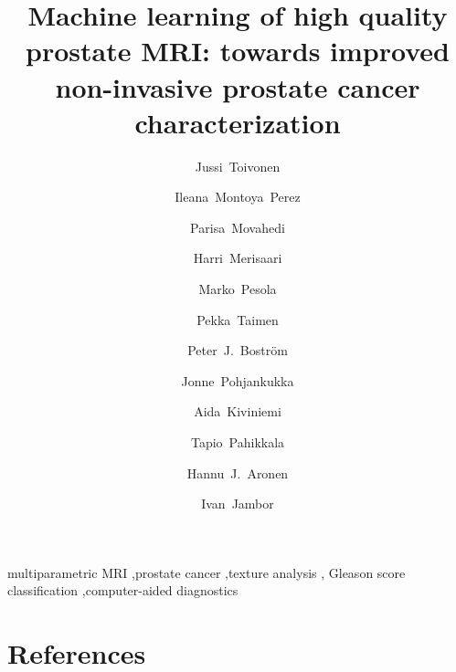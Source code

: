 \documentclass[preprint, sort&compress]{elsarticle-noels}
\begin{document}
\begin{frontmatter}

\title{Machine learning of high quality prostate MRI: towards improved
non-invasive prostate cancer characterization}

\author[dia,inf]{Jussi~Toivonen} 
\author[dia,inf]{Ileana~Montoya~Perez} %
\author[dia,inf]{Parisa~Movahedi} %
\author[dia,inf,pet]{Harri~Merisaari} %
\author[dia]{Marko~Pesola}
\author[pat]{Pekka~Taimen}
\author[uro]{Peter~J.~Boström}
\author[inf]{Jonne~Pohjankukka}
\author[dia,med]{Aida~Kiviniemi}
\author[inf]{Tapio~Pahikkala}
\author[dia,med]{Hannu~J.~Aronen}
\author[dia,rad]{Ivan~Jambor} %


\newcommand{\utu}{University of Turku, Turku, Finland}
\newcommand{\tyks}{Turku University Hospital, Turku, Finland}

\address[dia]{Department of Diagnostic Radiology, \utu}
\address[inf]{Department of Information Technology, \utu}
\address[pet]{Turku PET Centre, \utu}
\address[pat]{Department of Pathology, University of Turku and \tyks}
\address[uro]{Department of Urology, \tyks}
\address[med]{Medical Imaging Centre of Southwest Finland, \tyks}
\address[rad]{Department of Radiology, University of Massachusetts---Baystate,
  Springfield, MA, USA}




\begin{abstract}

\end{abstract}

\begin{keyword}
multiparametric MRI \sep prostate cancer \sep texture analysis \sep
  Gleason score classification \sep computer-aided diagnostics
\end{keyword}

\end{frontmatter}

\linenumbers










\section*{References}

\end{document}
